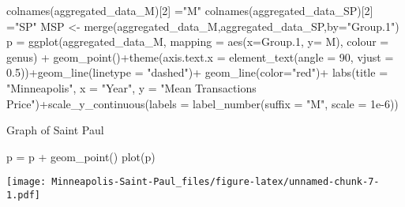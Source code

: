 \documentclass[
]{article}
\newenvironment{Shaded}{\begin{snugshade}}{\end{snugshade}}
\newcommand{\AttributeTok}[1]{\textcolor[rgb]{0.77,0.63,0.00}{#1}}
\newcommand{\DecValTok}[1]{\textcolor[rgb]{0.00,0.00,0.81}{#1}}
\newcommand{\FloatTok}[1]{\textcolor[rgb]{0.00,0.00,0.81}{#1}}
\newcommand{\FunctionTok}[1]{\textcolor[rgb]{0.00,0.00,0.00}{#1}}
\newcommand{\NormalTok}[1]{#1}
\newcommand{\OtherTok}[1]{\textcolor[rgb]{0.56,0.35,0.01}{#1}}
\newcommand{\SpecialCharTok}[1]{\textcolor[rgb]{0.00,0.00,0.00}{#1}}
\newcommand{\StringTok}[1]{\textcolor[rgb]{0.31,0.60,0.02}{#1}}
\begin{document}
\begin{Shaded}
\begin{Highlighting}[]
\FunctionTok{colnames}\NormalTok{(aggregated\_data\_M)[}\DecValTok{2}\NormalTok{] }\OtherTok{=}\StringTok{"M"}
\FunctionTok{colnames}\NormalTok{(aggregated\_data\_SP)[}\DecValTok{2}\NormalTok{] }\OtherTok{=}\StringTok{"SP"}
\NormalTok{MSP }\OtherTok{\textless{}{-}} \FunctionTok{merge}\NormalTok{(aggregated\_data\_M,aggregated\_data\_SP,}\AttributeTok{by=}\StringTok{"Group.1"}\NormalTok{) }
\NormalTok{p }\OtherTok{=} \FunctionTok{ggplot}\NormalTok{(aggregated\_data\_M, }\AttributeTok{mapping =} \FunctionTok{aes}\NormalTok{(}\AttributeTok{x=}\NormalTok{Group}\FloatTok{.1}\NormalTok{, }\AttributeTok{y=}\NormalTok{ M), }\AttributeTok{colour =}\NormalTok{ genus) }\SpecialCharTok{+} 
  \FunctionTok{geom\_point}\NormalTok{()}\SpecialCharTok{+}\FunctionTok{theme}\NormalTok{(}\AttributeTok{axis.text.x =} \FunctionTok{element\_text}\NormalTok{(}\AttributeTok{angle =} \DecValTok{90}\NormalTok{, }\AttributeTok{vjust =} \FloatTok{0.5}\NormalTok{))}\SpecialCharTok{+}\FunctionTok{geom\_line}\NormalTok{(}\AttributeTok{linetype =} \StringTok{"dashed"}\NormalTok{)}\SpecialCharTok{+} \FunctionTok{geom\_line}\NormalTok{(}\AttributeTok{color=}\StringTok{"red"}\NormalTok{)}\SpecialCharTok{+} \FunctionTok{labs}\NormalTok{(}\AttributeTok{title =} \StringTok{"Minneapolis"}\NormalTok{, }\AttributeTok{x =} \StringTok{"Year"}\NormalTok{, }\AttributeTok{y =} \StringTok{"Mean Transactions Price"}\NormalTok{)}\SpecialCharTok{+}\FunctionTok{scale\_y\_continuous}\NormalTok{(}\AttributeTok{labels =} \FunctionTok{label\_number}\NormalTok{(}\AttributeTok{suffix =} \StringTok{"M"}\NormalTok{, }\AttributeTok{scale =} \FloatTok{1e{-}6}\NormalTok{))}
\end{Highlighting}
\end{Shaded}

Graph of Saint Paul

\begin{Shaded}
\begin{Highlighting}[]
\NormalTok{p }\OtherTok{=}\NormalTok{ p }\SpecialCharTok{+} \FunctionTok{geom\_point}\NormalTok{()}
\FunctionTok{plot}\NormalTok{(p)}
\end{Highlighting}
\end{Shaded}

\texttt{[image: Minneapolis-Saint-Paul\_files/figure-latex/unnamed-chunk-7-1.pdf]}
\end{document}
